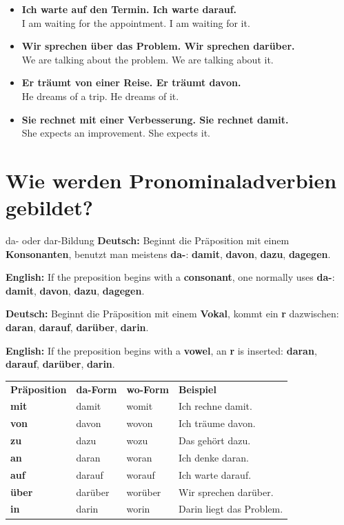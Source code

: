 \documentclass[a4paper,11pt]{article}
\newcommand{\GermanText}[1]{\textbf{Deutsch: }#1\par}
\newcommand{\EnglishText}[1]{{\small\color{SoftGray}\textbf{English: }#1\par}}
\newcommand{\ExampleItem}[2]{\item \textbf{#1}\\{\small\color{SoftGray}#2}}
\begin{document}
        \begin{exbox}
            \begin{itemize}
                \ExampleItem{Ich warte auf den Termin. Ich warte darauf.}{I am waiting for the appointment. I am waiting for it.}
                \ExampleItem{Wir sprechen über das Problem. Wir sprechen darüber.}{We are talking about the problem. We are talking about it.}
                \ExampleItem{Er träumt von einer Reise. Er träumt davon.}{He dreams of a trip. He dreams of it.}
                \ExampleItem{Sie rechnet mit einer Verbesserung. Sie rechnet damit.}{She expects an improvement. She expects it.}
            \end{itemize}
        \end{exbox}

    \section{Wie werden Pronominaladverbien gebildet?}

        \begin{grammarentry}{da- oder dar-}{Bildung}
            \GermanText{Beginnt die Präposition mit einem \textbf{Konsonanten}, benutzt man meistens \textbf{da-}: \textbf{damit}, \textbf{davon}, \textbf{dazu}, \textbf{dagegen}.}
            \EnglishText{If the preposition begins with a \textbf{consonant}, one normally uses \textbf{da-}: \textbf{damit}, \textbf{davon}, \textbf{dazu}, \textbf{dagegen}.}

            \GermanText{Beginnt die Präposition mit einem \textbf{Vokal}, kommt ein \textbf{r} dazwischen: \textbf{daran}, \textbf{darauf}, \textbf{darüber}, \textbf{darin}.}
            \EnglishText{If the preposition begins with a \textbf{vowel}, an \textbf{r} is inserted: \textbf{daran}, \textbf{darauf}, \textbf{darüber}, \textbf{darin}.}
        \end{grammarentry}

        \begin{longtable}{>{\bfseries}p{2.7cm}|p{3.4cm}|p{3.4cm}|p{4.4cm}}
            \rowcolor{HeaderBlueDark}
            \color{white}\textbf{Präposition} &
            \color{white}\textbf{da-Form} &
            \color{white}\textbf{wo-Form} &
            \color{white}\textbf{Beispiel} \\
            mit & damit & womit & Ich rechne damit. \\
            von & davon & wovon & Ich träume davon. \\
            zu & dazu & wozu & Das gehört dazu. \\
            an & daran & woran & Ich denke daran. \\
            auf & darauf & worauf & Ich warte darauf. \\
            über & darüber & worüber & Wir sprechen darüber. \\
            in & darin & worin & Darin liegt das Problem. \\
        \end{longtable}
\end{document}
